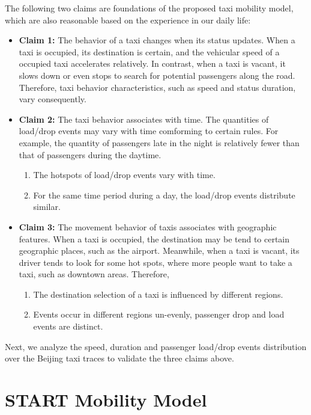 \documentclass[10pt,journal,compsocconf,letterpaper]{IEEEtran}
\begin{document}
The following two claims are foundations of the proposed taxi mobility model, which are also reasonable based on the experience in our daily life:
\begin{itemize}
  \item \textbf{Claim 1:} The behavior of a taxi changes when its status updates. When a taxi is occupied, its destination is certain, and the vehicular speed of a occupied taxi accelerates relatively. In contrast, when a taxi is vacant, it slows down or even stops to search for potential passengers along the road. Therefore, taxi behavior characteristics, such as speed and status duration, vary consequently.
 \item \textbf{Claim 2:} The taxi behavior associates with time. The quantities of load/drop events may vary with time comforming to certain rules. For example, the quantity of passengers late in the night is relatively fewer than that of passengers during the daytime. 
      \begin{enumerate}
        \item The hotspots of load/drop events vary with time.
        \item For the same time period during a day, the load/drop events distribute similar.
      \end{enumerate}

  \item \textbf{Claim 3:} The movement behavior of taxis associates with geographic features. When a taxi is occupied, the destination may be tend to certain geographic places, such as the airport. Meanwhile, when a taxi is vacant, its driver tends to look for some hot spots, where more people want to take a taxi, such as downtown areas. Therefore,
      \begin{enumerate}
        \item The destination selection of a taxi is influenced by different regions.
        \item Events occur in different regions un-evenly, passenger drop and load events are distinct.
      \end{enumerate}
\end{itemize}
Next, we analyze the speed, duration and passenger load/drop events distribution over the Beijing taxi traces to validate the three claims above.





\section{START Mobility Model}
\label{section_modeling}
\end{document}
